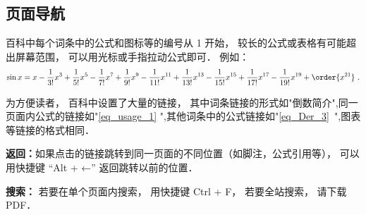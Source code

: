 
\subsection{页面导航}
百科中每个词条中的公式和图标等的编号从 1 开始， 较长的公式或表格有可能超出屏幕范围， 可以用光标或手指拉动公式即可． 例如：
\begin{equation}\label{eq_usage_1}
\sin x = x - \frac{1}{3!} x^3 + \frac{1}{5!} x^5 - \frac{1}{7!} x^7+\frac{1}{9!} x^9-\frac{1}{11!} x^{11}+\frac{1}{13!} x^{13}-\frac{1}{15!} x^{15}+\frac{1}{17!} x^{17}-\frac{1}{19!} x^{19}+ \order{x^{21}}~.
\end{equation}

为方便读者， 百科中设置了大量的链接， 其中词条链接的形式如"倒数简介",同一页面内公式的链接如"\autoref{eq_usage_1} ",其他词条中的公式链接如"\autoref{eq_Der_3}~",图表等链接的格式相同．

\textbf{返回：}如果点击的链接跳转到同一页面的不同位置（如脚注，公式引用等）， 可以用快捷键 “Alt + ←” 返回跳转以前的位置．

\textbf{搜索：} 若要在单个页面内搜索， 用快捷键 Ctrl + F， 若要全站搜索， 请下载 PDF．

